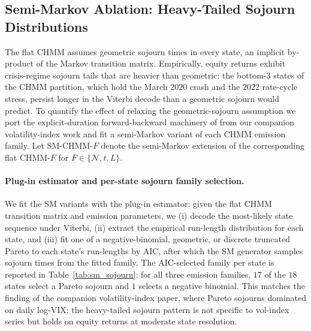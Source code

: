 \subsection{Semi-Markov Ablation: Heavy-Tailed Sojourn Distributions}
\label{sec:sm_ablation}

The flat CHMM assumes geometric sojourn times in every state, an implicit by-product of the Markov transition matrix.
Empirically, equity returns exhibit crisis-regime sojourn tails that are heavier than geometric: the bottom-$3$ states of the CHMM partition, which hold the March $2020$ crash and the $2022$ rate-cycle stress, persist longer in the Viterbi decode than a geometric sojourn would predict.
To quantify the effect of relaxing the geometric-sojourn assumption we port the explicit-duration forward-backward machinery of \citet{yu2010hidden} from our companion volatility-index work and fit a semi-Markov variant of each CHMM emission family.
Let $\mathrm{SM\text{-}CHMM\text{-}}F$ denote the semi-Markov extension of the corresponding flat CHMM-$F$ for $F \in \{\mathcal{N}, t, L\}$.

\paragraph{Plug-in estimator and per-state sojourn family selection.}
We fit the SM variants with the plug-in estimator: given the flat CHMM transition matrix and emission parameters, we (i) decode the most-likely state sequence under Viterbi, (ii) extract the empirical run-length distribution for each state, and (iii) fit one of a negative-binomial, geometric, or discrete truncated Pareto to each state's run-lengths by AIC, after which the SM generator samples sojourn times from the fitted family.
The AIC-selected family per state is reported in Table~\ref{tab:sm_sojourn}: for all three emission families, $17$ of the $18$ states select a Pareto sojourn and $1$ selects a negative binomial.
This matches the finding of the companion volatility-index paper, where Pareto sojourns dominated on daily log-$\mathrm{VIX}$: the heavy-tailed sojourn pattern is not specific to vol-index series but holds on equity returns at moderate state resolution.

